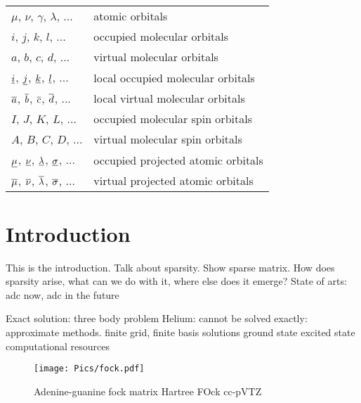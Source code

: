 \documentclass[a4paper,12pt]{report}
\begin{document}
\begin{table}[h]
\setlength{\tabcolsep}{14pt}
\renewcommand{\arraystretch}{1.5}
\begin{tabular}{ll}
$\mu$, $\nu$, $\gamma$, $\lambda$, ... & atomic orbitals \\
$i$, $j$, $k$, $l$, ... & occupied molecular orbitals \\
$a$, $b$, $c$, $d$, ... & virtual molecular orbitals \\
$\underline{i}$, $\underline{j}$, $\underline{k}$, $\underline{l}$, ... & local occupied molecular orbitals \\
$\overline{a}$, $\overline{b}$, $\overline{c}$, $\overline{d}$, ... & local virtual molecular orbitals \\
$I$, $J$, $K$, $L$, ... & occupied molecular spin orbitals \\
$A$, $B$, $C$, $D$, ... & virtual molecular spin orbitals \\
$\underline{\mu}$, $\underline{\nu}$, $\underline{\lambda}$, $\underline{\sigma}$, ... & occupied projected atomic orbitals \\
$\overline{\mu}$, $\overline{\nu}$, $\overline{\lambda}$, $\overline{\sigma}$, ... & virtual projected atomic orbitals
\end{tabular}
\end{table}




\newpage

\tableofcontents

\newpage

\listoffigures

\newpage

\listoftables

\newpage


\chapter*{Introduction}

This is the introduction. Talk about sparsity. Show sparse matrix. How does sparsity arise, what can we do with it, where else does it emerge?
State of arts: adc now, adc in the future

Exact solution: three body problem
Helium: cannot be solved exactly: approximate methods. finite grid, finite basis
solutions
ground state excited state
computational resources

\begin{figure}
\centering
\texttt{[image: Pics/fock.pdf]}
\caption{Adenine-guanine fock matrix Hartree FOck cc-pVTZ}
\label{SparseExample}
\end{figure}
\end{document}
